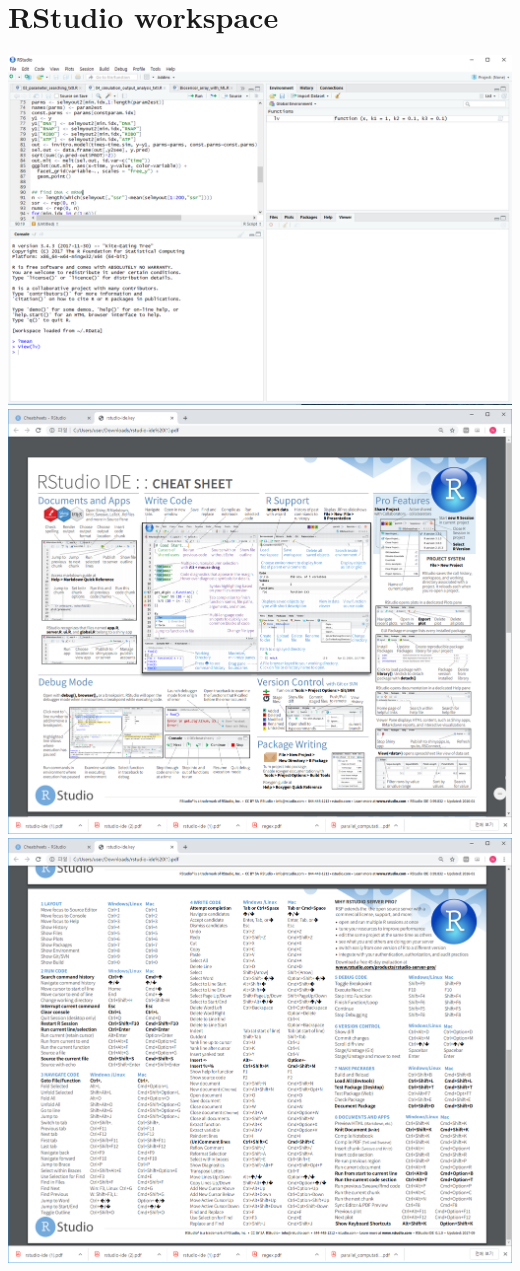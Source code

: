\documentclass[]{book}
\begin{document}
\hypertarget{rstudio-workspace}{%
\section{RStudio workspace}\label{rstudio-workspace}}

\includegraphics{images/01-17.PNG}
\includegraphics{images/rstudio-ide-1.png}
\includegraphics{images/rstudio-ide-2.png}
\end{document}
